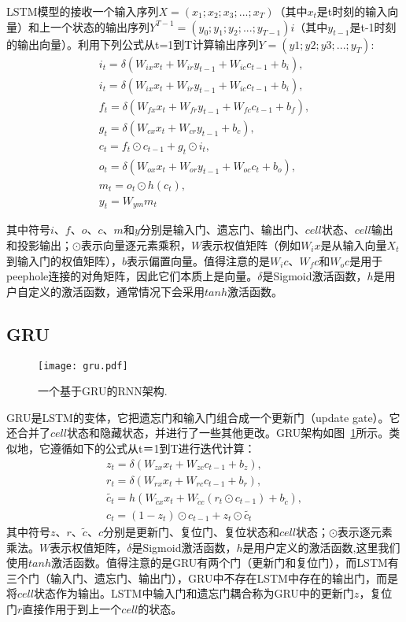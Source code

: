 LSTM模型的接收一个输入序列$X=(x_1;x_2;x_3;...;x_T)$（其中$x_t$是t时刻的输入向量）和上一个状态的输出序列$Y^{T-1}=(y_0;y_1;y_2;...;y_{T-1})i$（其中$y_{t-1}$是t-1时刻的输出向量）。利用下列公式从t=1到T计算输出序列$Y=(y1;y2;y3;...;y_T)$:
\begin{gather}
i_t=\delta (W_{ix}x_t + W_{ir}y_{t-1} + W_{ic}c_{t-1} + b_i), \\
i_t=\delta (W_{ix}x_t + W_{ir}y_{t-1} + W_{ic}c_{t-1} + b_i), \\
f_t=\delta (W_{fx}x_t + W_{fr}y_{t-1} + W_{fc}c_{t-1} + b_f), \\
g_t=\delta (W_{cx}x_t + W_{cr}y_{t-1} + b_c), \\
c_t=f_t \odot c_{t-1} + g_t \odot i_t, \\
o_t=\delta (W_{ox}x_t + W_{or}y_{t-1} + W_{oc}c_{t} + b_o), \\
m_t=o_t \odot h(c_t), \\
y_t=W_{ym}m_t 
\end{gather}

其中符号$i$、$f$、$o$、$c$、$m$和$y$分别是输入门、遗忘门、输出门、$cell$状态、$cell$输出和投影输出；$\odot$表示向量逐元素乘积，$W$表示权值矩阵（例如$W_ix$是从输入向量$X_t$到输入门的权值矩阵），$b$表示偏置向量。值得注意的是$W_ic$、$W_fc$和$W_oc$是用于peephole连接的对角矩阵，因此它们本质上是向量。$\delta$是Sigmoid激活函数，$h$是用户自定义的激活函数，通常情况下会采用$tanh$激活函数。

\subsection{GRU}
\begin{figure}[b]
  \centering
  \texttt{[image: gru.pdf]}
  \caption{\footnotesize 一个基于GRU的RNN架构.}
  \label{fig:gru}
\end{figure}
GRU是LSTM的变体，它把遗忘门和输入门组合成一个更新门（update gate）。它还合并了$cell$状态和隐藏状态，并进行了一些其他更改。GRU架构如图~\ref{fig:gru}所示。类似地，它遵循如下的公式从t＝1到T进行迭代计算：
\begin{gather}
z_t=\delta(W_{zx}x_t+W_{zc}c_{t-1}+b_z),\\
r_t=\delta(W_{rx}x_t+W_{rc}c_{t-1}+b_r),\\
\tilde{c_t}=h(W_{\tilde{c}x}x_t+W_{\tilde{c}c}(r_t \odot c_{t-1}) + b_{\tilde{c}}),\\
c_t=(1-z_t) \odot c_{t-1} + z_t \odot \tilde{c_t}
\end{gather}
其中符号$z$、$r$、$\tilde{c}$、$c$分别是更新门、复位门、复位状态和$cell$状态；$\odot$表示逐元素乘法。$W$表示权值矩阵，$\delta$是Sigmoid激活函数，$h$是用户定义的激活函数,这里我们使用$tanh$激活函数。值得注意的是GRU有两个门（更新门和复位门），而LSTM有三个门（输入门、遗忘门、输出门），GRU中不存在LSTM中存在的输出门，而是将$cell$状态作为输出。LSTM中输入门和遗忘门耦合称为GRU中的更新门$z$，复位门$r$直接作用于到上一个$cell$的状态。 



